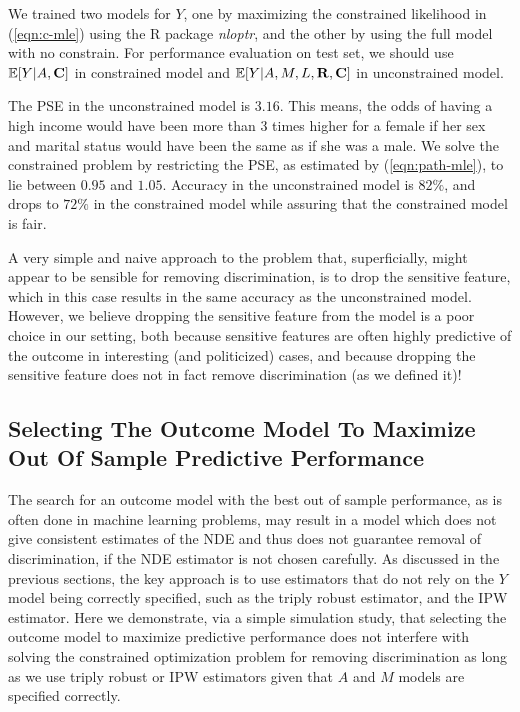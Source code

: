 \documentclass[letterpaper]{article} %
\begin{document}
We trained two models for $Y$, one by maximizing the constrained likelihood in (\ref{eqn:c-mle}) using the R package \textit{nloptr}, and the other by using the full model with no constrain. For performance evaluation on test set, we should use $\mathbb{E}[Y | A,{\bf C}]$ in constrained model and $\mathbb{E}[Y | A, M, L, {\bf R, C}]$ in unconstrained model. 

The PSE in the unconstrained model is $3.16$. This means, the odds of having a high income would have been more than 3 times higher for a female if her sex and marital status would have been the same as if she was a male. We solve the constrained problem by restricting the PSE, as estimated by (\ref{eqn:path-mle}), to lie between $0.95$ and $1.05$. Accuracy in the unconstrained model is $82\%$, and drops to $72\%$ in the constrained model while assuring that the constrained model is fair. 

A very simple and naive approach to the problem that, superficially, might appear to be sensible for removing discrimination, is to drop the sensitive feature, which in this case results in the same accuracy as the unconstrained model. However, we believe dropping the sensitive feature from the model is a poor choice in our setting, both because sensitive features are often highly predictive of the outcome in interesting (and politicized) cases, and because dropping the sensitive feature does not in fact remove discrimination (as we defined it)!  


\subsection{Selecting The Outcome Model To Maximize Out Of Sample Predictive Performance}

The search for an outcome model with the best out of sample performance, as is often done in machine learning problems, may result in a model which does not give consistent estimates of the NDE and thus does not guarantee removal of discrimination, if the NDE estimator is not chosen carefully.
As discussed in the previous sections, the key approach is to use estimators that do not rely on the $Y$ model being correctly specified, such as the triply robust estimator, and the IPW estimator.  Here we demonstrate, via a simple simulation study, that selecting the outcome model to maximize predictive performance does not interfere with solving the constrained optimization problem for removing discrimination as long as we use triply robust or IPW estimators given that $A$ and $M$ models are specified correctly. 
\end{document}

